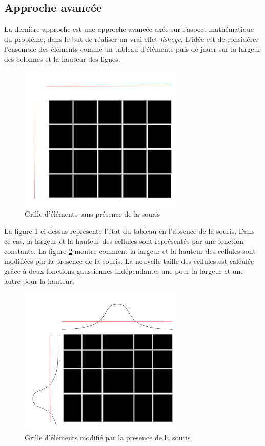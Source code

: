 \subsection{Approche avancée}

La dernière approche est une approche avancée axée sur l'aspect mathématique du problème, dans le but de réaliser un \og vrai \fg{} effet \emph{fisheye}. L'idée est de considérer l'ensemble des éléments comme un tableau d'éléments puis de jouer sur la largeur des colonnes et la hauteur des lignes.

\begin{figure}[H]
  \centering
  \includegraphics[width=0.7\textwidth]{../resources/illustrations/js_1}
  \caption{Grille d'éléments sans présence de la souris}
  \label{fig:js_1}
\end{figure}

La figure \ref{fig:js_1} ci-dessus représente l'état du tableau en
l'absence de la souris. Dans ce cas, la largeur et la hauteur des
cellules sont représentés par une fonction constante. La figure
\ref{fig:js_2} montre comment la largeur et la hauteur des cellules
sont modifiées par la présence de la souris. La nouvelle taille des
cellules est calculée grâce à deux fonctions gaussiennes indépendante,
une pour la largeur et une autre pour la hauteur.  

\begin{figure}[H]
  \centering
  \includegraphics[width=0.7\textwidth]{../resources/illustrations/js_2}
  \caption{Grille d'éléments modifié par la présence de la souris}
    \label{fig:js_2}
\end{figure}

